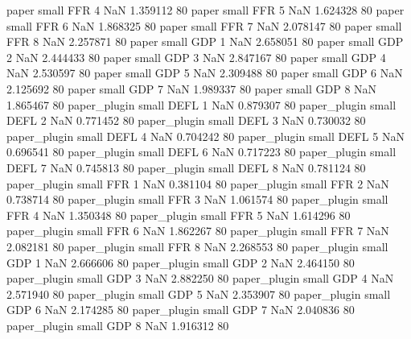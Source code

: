             paper      small      FFR                 4                  NaN 1.359112 80
            paper      small      FFR                 5                  NaN 1.624328 80
            paper      small      FFR                 6                  NaN 1.868325 80
            paper      small      FFR                 7                  NaN 2.078147 80
            paper      small      FFR                 8                  NaN 2.257871 80
            paper      small      GDP                 1                  NaN 2.658051 80
            paper      small      GDP                 2                  NaN 2.444433 80
            paper      small      GDP                 3                  NaN 2.847167 80
            paper      small      GDP                 4                  NaN 2.530597 80
            paper      small      GDP                 5                  NaN 2.309488 80
            paper      small      GDP                 6                  NaN 2.125692 80
            paper      small      GDP                 7                  NaN 1.989337 80
            paper      small      GDP                 8                  NaN 1.865467 80
     paper_plugin      small     DEFL                 1                  NaN 0.879307 80
     paper_plugin      small     DEFL                 2                  NaN 0.771452 80
     paper_plugin      small     DEFL                 3                  NaN 0.730032 80
     paper_plugin      small     DEFL                 4                  NaN 0.704242 80
     paper_plugin      small     DEFL                 5                  NaN 0.696541 80
     paper_plugin      small     DEFL                 6                  NaN 0.717223 80
     paper_plugin      small     DEFL                 7                  NaN 0.745813 80
     paper_plugin      small     DEFL                 8                  NaN 0.781124 80
     paper_plugin      small      FFR                 1                  NaN 0.381104 80
     paper_plugin      small      FFR                 2                  NaN 0.738714 80
     paper_plugin      small      FFR                 3                  NaN 1.061574 80
     paper_plugin      small      FFR                 4                  NaN 1.350348 80
     paper_plugin      small      FFR                 5                  NaN 1.614296 80
     paper_plugin      small      FFR                 6                  NaN 1.862267 80
     paper_plugin      small      FFR                 7                  NaN 2.082181 80
     paper_plugin      small      FFR                 8                  NaN 2.268553 80
     paper_plugin      small      GDP                 1                  NaN 2.666606 80
     paper_plugin      small      GDP                 2                  NaN 2.464150 80
     paper_plugin      small      GDP                 3                  NaN 2.882250 80
     paper_plugin      small      GDP                 4                  NaN 2.571940 80
     paper_plugin      small      GDP                 5                  NaN 2.353907 80
     paper_plugin      small      GDP                 6                  NaN 2.174285 80
     paper_plugin      small      GDP                 7                  NaN 2.040836 80
     paper_plugin      small      GDP                 8                  NaN 1.916312 80